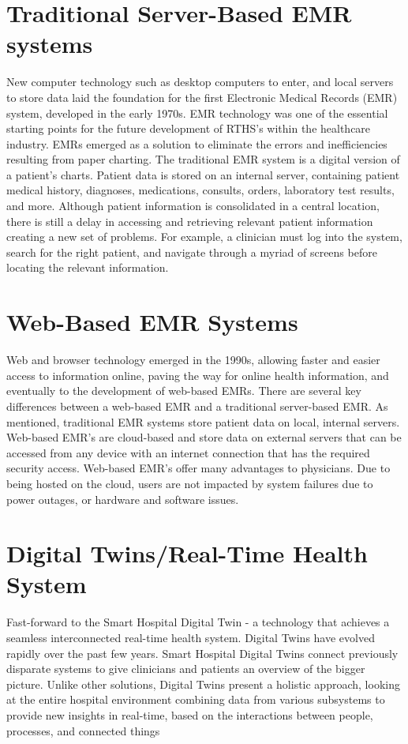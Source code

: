 \documentclass[12pt]{article}
\begin{document}
\section*{Traditional Server-Based EMR systems }
New computer technology such as desktop computers to enter, and local servers to store data laid the foundation for the first Electronic Medical Records (EMR) system, developed in the early 1970s. EMR technology was one of the essential starting points for the future development of RTHS’s within the healthcare industry. EMRs emerged as a solution to eliminate the errors and inefficiencies resulting from paper charting. The traditional EMR system is a digital version of a patient’s charts. Patient data is stored on an internal server, containing patient medical history, diagnoses, medications, consults, orders, laboratory test results, and more. Although patient information is consolidated in a central location, there is still a delay in accessing and retrieving relevant patient information creating a new set of problems. For example, a clinician must log into the system, search for the right patient, and navigate through a myriad of screens before locating the relevant information. 

 

\section*{Web-Based EMR Systems }
Web and browser technology emerged in the 1990s, allowing faster and easier access to information online, paving the way for online health information, and eventually to the development of web-based EMRs. There are several key differences between a web-based EMR and a traditional server-based EMR. As mentioned, traditional EMR systems store patient data on local, internal servers. Web-based EMR’s are cloud-based and store data on external servers that can be accessed from any device with an internet connection that has the required security access. Web-based EMR’s offer many advantages to physicians. Due to being hosted on the cloud, users are not impacted by system failures due to power outages, or hardware and software issues.




\section*{Digital Twins/Real-Time Health System}
Fast-forward to the Smart Hospital Digital Twin - a technology that achieves a seamless interconnected real-time health system. Digital Twins have evolved rapidly over the past few years. Smart Hospital Digital Twins connect previously disparate systems to give clinicians and patients an overview of the bigger picture. Unlike other solutions, Digital Twins present a holistic approach, looking at the entire hospital environment combining data from various subsystems to provide new insights in real-time, based on the interactions between people, processes, and connected things
\linebreak
 
\end{document}
